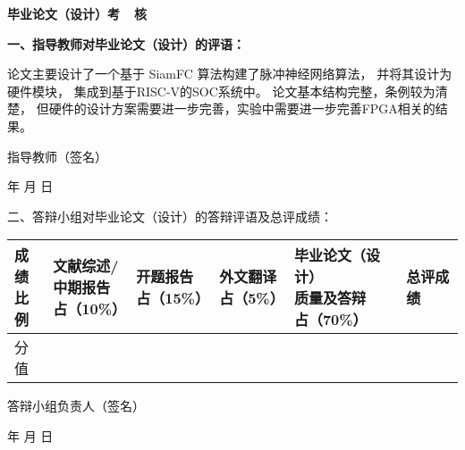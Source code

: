 
{
\fangsong
\begin{center}
    \xiaoer \bfseries
    毕业论文（设计）考~~核
\end{center}
\bfseries
\noindent
一、指导教师对毕业论文（设计）的评语：

{
\normalfont \fangsong
论文主要设计了一个基于 SiamFC 算法构建了脉冲神经网络算法， 并将其设计为硬件模块， 集成到基于RISC-V的SOC系统中。 论文基本结构完整，条例较为清楚， 但硬件的设计方案需要进一步完善，实验中需要进一步完善FPGA相关的结果。}

\vspace{2cm}


\begin{flushright}
    指导教师（签名） \underline{\hspace{3cm}} \hspace{1cm}

    \vspace{1cm}

    年 \hspace{1cm} 月 \hspace{1cm} 日
\end{flushright}


\noindent
二、答辩小组对毕业论文（设计）的答辩评语及总评成绩：

\vfill

\begin{center}
    \begin{tabular}{|p{1cm}|p{2cm}|p{2cm}|p{2cm}|p{3.2cm}|p{2cm}|}
        \hline
        \makecell{成绩     \\ 比例}                     & \makecell{文献综述/            \\ 中期报告 \\占（10\%）} & \makecell{开题报告 \\ 占（15\%）} & \makecell{外文翻译 \\ 占（5\%）} & \makecell{毕业论文（设计）\\质量及答辩 \\ 占（70\%）} & 总评成绩 \\
        \hline
        分值 &  &  &  &  & \\
        \hline
    \end{tabular}
\end{center}


\begin{flushright}
    答辩小组负责人（签名） \underline{\hspace{3cm}} \hspace{1cm}

    \vspace{1cm}

    年 \hspace{1cm} 月 \hspace{1cm} 日
\end{flushright}
\thispagestyle{empty}
}
